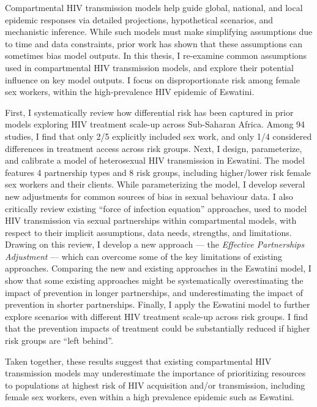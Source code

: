 \par %
Compartmental HIV transmission models help guide global, national, and local epidemic responses
via detailed projections, hypothetical scenarios, and mechanistic inference.
While such models must make simplifying assumptions due to time and data constraints,
prior work has shown that these assumptions can sometimes bias model outputs.
In this thesis, I re-examine common assumptions used in compartmental HIV transmission models,
and explore their potential influence on key model outputs.
I focus on disproportionate risk among female sex workers,
within the high-prevalence HIV epidemic of Eswatini.
\par %
First, I systematically review how differential risk has been captured in
prior models exploring HIV treatment scale-up across Sub-Saharan Africa.
Among 94 studies, I find that only 2/5 explicitly included sex work,
and only 1/4 considered differences in treatment access across risk groups.
Next, I design, parameterize, and calibrate a model of heterosexual HIV transmission in Eswatini.
The model features 4 partnership types and 8 risk groups, including
higher/lower risk female sex workers and their clients.
While parameterizing the model, I develop several new adjustments
for common sources of bias in sexual behaviour data.
I also critically review existing ``force of infection equation'' approaches,
used to model HIV transmission via sexual partnerships within compartmental models,
with respect to their implicit assumptions, data needs, strengths, and limitations.
Drawing on this review, I develop a new approach
--- the \emph{Effective Partnerships Adjustment} ---
which can overcome some of the key limitations of existing approaches.
Comparing the new and existing approaches in the Eswatini model,
I show that some existing approaches might be systematically
overestimating the impact of prevention in longer partnerships, and
underestimating the impact of prevention in shorter partnerships.
Finally, I apply the Eswatini model to further explore
scenarios with different HIV treatment scale-up across risk groups.
I find that the prevention impacts of treatment could be substantially reduced
if higher risk groups are ``left behind''.
\par %
Taken together, these results suggest that existing compartmental HIV transmission models
may underestimate the importance of prioritizing resources to
populations at highest risk of HIV acquisition and/or transmission,
including female sex workers, even within a high prevalence epidemic such as Eswatini.

